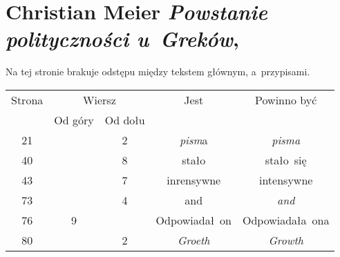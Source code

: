 \documentclass[a4paper,11pt]{article}
\numberwithin{equation}{section}
\begin{document}
\VerSpaceTwo












\newpage

\section{Christian Meier \textit{Powstanie polityczności u~Greków},
  \cite{MeierPowstaniePolitycznosciUGrekow2012}}


\vspace{0em}



\vspace{0em}


\noindent
{} Na tej stronie brakuje odstępu między tekstem głównym,
a~przypisami.

\VerSpaceFour





\newpage



\begin{center}

  \begin{tabular}{|c|c|c|c|c|}
    \hline
    Strona & \multicolumn{2}{c|}{Wiersz} & Jest
                              & Powinno być \\ \cline{2-3}
    & Od góry & Od dołu & & \\
    \hline
    21  & &  2 & \textit{pism}a & \textit{pisma} \\
    40  & &  8 & stało & stało~się \\
    43  & &  7 & inrensywne & intensywne \\
    73  & &  4 & and & \textit{and} \\
    76  &  9 & & Odpowiadał~on & Odpowiadała~ona \\
    80  & &  2 & \textit{Groeth} & \textit{Growth} \\
    \hline
  \end{tabular}

\end{center}
\end{document}
